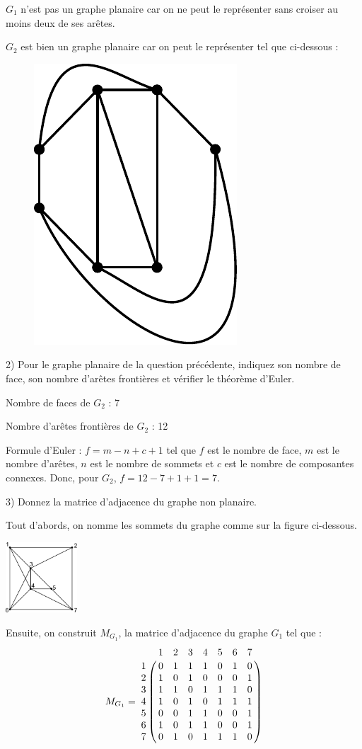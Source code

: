 \documentclass[a4paper,11pt]{article}
\begin{document}
$G_1$ n'est pas un graphe planaire car on ne peut le représenter sans croiser au moins deux de ses arêtes.

$G_2$ est bien un graphe planaire car on peut le représenter tel que ci-dessous :

\begin{figure}[h!]
	\centering
	\includegraphics[width=0.25\linewidth]{./graphe2_correction.pdf}
\end{figure}

2) Pour le graphe planaire de la question précédente, indiquez son nombre de face, son nombre d'arêtes frontières et vérifier le théorème d'Euler.

Nombre de faces de $G_2$ : 7

Nombre d'arêtes frontières de $G_2$ : 12

Formule d'Euler : $f = m - n + c + 1$ tel que $f$ est le nombre de face, $m$ est le nombre d'arêtes, $n$ est le nombre de sommets et $c$ est le nombre de composantes connexes. Donc, pour $G_2$, $f = 12 - 7 + 1 + 1 = 7$.

3) Donnez la matrice d'adjacence du graphe non planaire.


\newpage
\begin{multicols}{2}
    Tout d'abords, on nomme les sommets du graphe comme sur la figure ci-dessous.

    \centering
    \includegraphics[width=0.2\textwidth]{./graphe1_correction.pdf}

    Ensuite, on construit $M_{G_1}$, la matrice d'adjacence du graphe $G_1$ tel que :
    $$M_{G_1} = 
    \bordermatrix{
        ~   & 1  & 2  & 3  & 4  & 5  & 6  & 7 \cr
        1   & 0  & 1  & 1  & 1  & 0  & 1  & 0 \cr
        2   & 1  & 0  & 1  & 0  & 0  & 0  & 1 \cr
        3   & 1  & 1  & 0  & 1  & 1  & 1  & 0 \cr
        4   & 1  & 0  & 1  & 0  & 1  & 1  & 1 \cr
        5   & 0  & 0  & 1  & 1  & 0  & 0  & 1 \cr
        6   & 1  & 0  & 1  & 1  & 0  & 0  & 1 \cr
        7   & 0  & 1  & 0  & 1  & 1  & 1  & 0 \cr
    }$$
\end{multicols}
\end{document}
